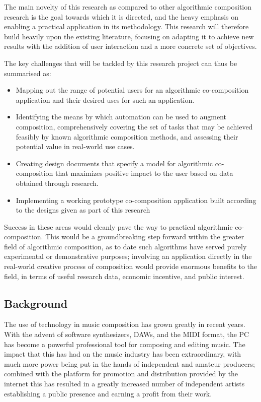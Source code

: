 \documentclass[11pt]{article}
\begin{document}
	The main novelty of this research as compared to other algorithmic composition research is the goal towards which it is directed, and the heavy emphasis on enabling a practical application in its methodology. This research will therefore build heavily upon the existing literature, focusing on adapting it to achieve new results with the addition of user interaction and a more concrete set of objectives. 
	
	The key challenges that will be tackled by this research project can thus be summarised as:
	\begin{itemize}
		\item Mapping out the range of potential users for an algorithmic co-composition application and their desired uses for such an application.
		\item Identifying the means by which automation can be used to augment composition, comprehensively covering the set of tasks that may be achieved feasibly by known algorithmic composition methods, and assessing their potential value in real-world use cases.
		\item Creating design documents that specify a model for algorithmic co-composition that maximizes positive impact to the user based on data obtained through research.
		\item Implementing a working prototype co-composition application built according to the designs given as part of this research
	\end{itemize}
	
	Success in these areas would cleanly pave the way to practical algorithmic co-composition. This would be a groundbreaking step forward within the greater field of algorithmic composition, as to date such algorithms have served purely experimental or demonstrative purposes; involving an application directly in the real-world creative process of composition would provide enormous benefits to the field, in terms of useful research data, economic incentive, and public interest. 
	
	\subsection{Background}
	
	The use of technology in music composition has grown greatly in recent years. With the advent of software synthesizers, DAWs, and the MIDI format, the PC has become a powerful professional tool for composing and editing music. The impact that this has had on the music industry has been extraordinary, with much more power being put in the hands of independent and amateur producers; combined with the platform for promotion and distribution provided by the internet this has resulted in a greatly increased number of independent artists establishing a public presence and earning a profit from their work.
		
\end{document}
